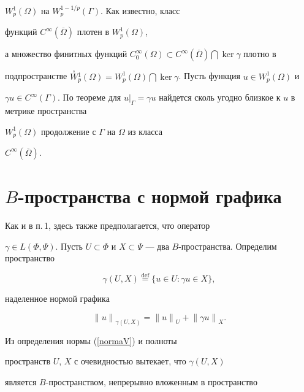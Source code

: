 $W_p^1(\Omega)$ на $W_p^{1-1/p}(\Gamma)$. Как известно, класс


функций $C^{\infty}(\overline{\Omega})$ плотен в $W_p^1(\Omega)$,


а множество финитных функций $C_0^{\infty}(\Omega) \subset


C^{\infty}(\overline{\Omega}) \bigcap \ker \gamma$ плотно в


подпространстве $\overset{\circ}{W}{}_p^1(\Omega)=W_p^1(\Omega)


\bigcap \ker \gamma$. Пусть функция $u \in W_p^1(\Omega)$ и


$\gamma u \in C^\infty(\Gamma)$. По теореме для $u|_\Gamma=\gamma


u$ найдется сколь угодно близкое к $u$ в метрике пространства


$W_p^1(\Omega)$ продолжение с $\Gamma$ на $\Omega$ из класса


$C^\infty(\overline{\Omega})$.








\section{$B$-пространства с нормой графика} \label{force}





Как и в п.\,1, здесь также предполагается, что оператор


$\gamma \in L(\Phi, \Psi)$. Пусть $U \subset \Phi$ и $X \subset


\Psi$ --- два $B$-пространства. Определим пространство


$$


\gamma (U, X) \overset{\mathrm{def}}{=}{} \{u \in U: \gamma u \in X\},


$$


наделенное нормой графика


\begin{equation}


{\|u\|}_{\gamma(U,X)}={\|u\|}_U+{\|\gamma u\|}_X.


\label{normaV}


\end{equation}


Из определения нормы (\ref{normaV}) и полноты


пространств $U$, $X$ с очевидностью вытекает, что $\gamma(U,X)$


является $B$-пространством, непрерывно вложенным в пространство


